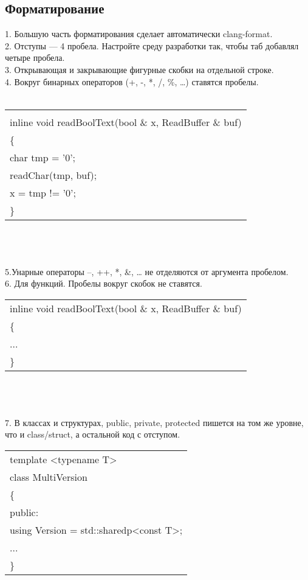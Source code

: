 \documentclass{article}
\begin{document}
\subsection{Форматирование}
1. Большую часть форматирования сделает автоматически clang-format.\\
2. Отступы — 4 пробела. Настройте среду разработки так, чтобы таб добавлял четыре пробела.\\
3. Открывающая и закрывающие фигурные скобки на отдельной строке.\\
4. Вокруг бинарных операторов (+, -, *, /, \%, …) ставятся пробелы.\\\\
\begin{tabular}{ |l|}

\hline
 \\
inline void readBoolText(bool \& x, ReadBuffer \& buf)\\
\{\\
    char tmp = '0';\\
    readChar(tmp, buf);\\
    x = tmp != '0';\\
\}\\
\hline
\end{tabular}\\\\\\
5.Унарные операторы --, ++, *, &, … не отделяются от аргумента пробелом.\\
6. Для функций. Пробелы вокруг скобок не ставятся.\\
\begin{tabular}{ |l|}

\hline
 
inline void readBoolText(bool \& x, ReadBuffer \& buf)\\
\{\\
...\\
\}\\
\hline
\end{tabular}\\\\\\
7. В классах и структурах, public, private, protected пишется на том же уровне, что и class/struct, а остальной код с отступом.\\
\begin{tabular}{ |l|}

\hline
 template <typename T>\\
class MultiVersion\\
\{\\
public:\\
    using Version = std::sharedp<const T>;\\
    ...\\
\}\\
\hline
\end{tabular}\\\\\\
\end{document}
